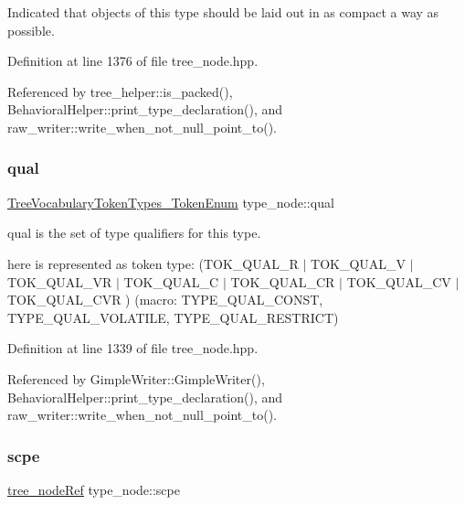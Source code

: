 Indicated that objects of this type should be laid out in as compact a way as possible. 



Definition at line 1376 of file tree\+\_\+node.\+hpp.



Referenced by tree\+\_\+helper\+::is\+\_\+packed(), Behavioral\+Helper\+::print\+\_\+type\+\_\+declaration(), and raw\+\_\+writer\+::write\+\_\+when\+\_\+not\+\_\+null\+\_\+point\+\_\+to().

\mbox{\label{structtype__node_afd6ecbc785e57218569bacd66feb53c8}} 
\subsubsection{\texorpdfstring{qual}{qual}}
{\footnotesize\ttfamily \hyperlink{token__interface_8hpp_a14502d0757789149f644966ca931b126}{Tree\+Vocabulary\+Token\+Types\+\_\+\+Token\+Enum} type\+\_\+node\+::qual}



qual is the set of type qualifiers for this type. 

here is represented as token type\+: (T\+O\+K\+\_\+\+Q\+U\+A\+L\+\_\+R $\vert$ T\+O\+K\+\_\+\+Q\+U\+A\+L\+\_\+V $\vert$ T\+O\+K\+\_\+\+Q\+U\+A\+L\+\_\+\+VR $\vert$ T\+O\+K\+\_\+\+Q\+U\+A\+L\+\_\+C $\vert$ T\+O\+K\+\_\+\+Q\+U\+A\+L\+\_\+\+CR $\vert$ T\+O\+K\+\_\+\+Q\+U\+A\+L\+\_\+\+CV $\vert$ T\+O\+K\+\_\+\+Q\+U\+A\+L\+\_\+\+C\+VR ) (macro\+: T\+Y\+P\+E\+\_\+\+Q\+U\+A\+L\+\_\+\+C\+O\+N\+ST, T\+Y\+P\+E\+\_\+\+Q\+U\+A\+L\+\_\+\+V\+O\+L\+A\+T\+I\+LE, T\+Y\+P\+E\+\_\+\+Q\+U\+A\+L\+\_\+\+R\+E\+S\+T\+R\+I\+CT) 

Definition at line 1339 of file tree\+\_\+node.\+hpp.



Referenced by Gimple\+Writer\+::\+Gimple\+Writer(), Behavioral\+Helper\+::print\+\_\+type\+\_\+declaration(), and raw\+\_\+writer\+::write\+\_\+when\+\_\+not\+\_\+null\+\_\+point\+\_\+to().

\mbox{\label{structtype__node_aefd293d6db40bfc3caba9fa430294cd0}} 
\subsubsection{\texorpdfstring{scpe}{scpe}}
{\footnotesize\ttfamily \hyperlink{tree__node_8hpp_a6ee377554d1c4871ad66a337eaa67fd5}{tree\+\_\+node\+Ref} type\+\_\+node\+::scpe}



